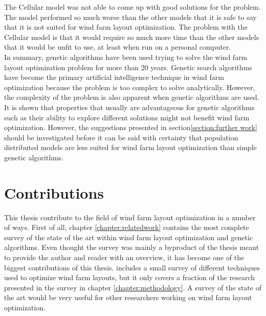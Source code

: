 \noindent The Cellular model was not able to come up with good solutions for the problem. The model performed so much worse than the other models that it is safe to say that it is not suited for wind farm layout optimization. The problem with the Cellular model is that it would require so much more time than the other models that it would be unfit to use, at least when run on a personal computer.\\

\noindent In summary, genetic algorithms have been used trying to solve the wind farm layout optimization problem for more than 20 years. Genetic search algorithms have become the primary artificial intelligence technique in wind farm optimization because the problem is too complex to solve analytically. However, the complexity of the problem is also apparent when genetic algorithms are used. It is shown that properties that usually are advantageous for genetic algorithms such as  their ability to explore different solutions might not benefit wind farm optimization. However, the suggestions presented in section\ref{section:further work} should be investigated before it can be said with certainty that population distributed models are less suited for wind farm layout optimization than simple genetic algorithms.\\


\section{Contributions}\label{section:contributions}
This thesis contribute to the field of wind farm layout optimization in a number of ways. First of all, chapter \ref{chapter:relatedwork} contains the most complete survey of the state of the art within wind farm layout optimization and genetic algorithms. Even thought the survey was mainly a byproduct of the thesis meant to provide the author and reader with an overview, it has become one of the biggest contributions of this thesis. \cite{Samorani} includes a small survey of different techniques used to optimize wind farm layouts, but it only covers a fraction of the research presented in the survey in chapter \ref{chapter:methodology}. A survey of the state of the art would be very useful for other researchers working on wind farm layout optimization.\\

